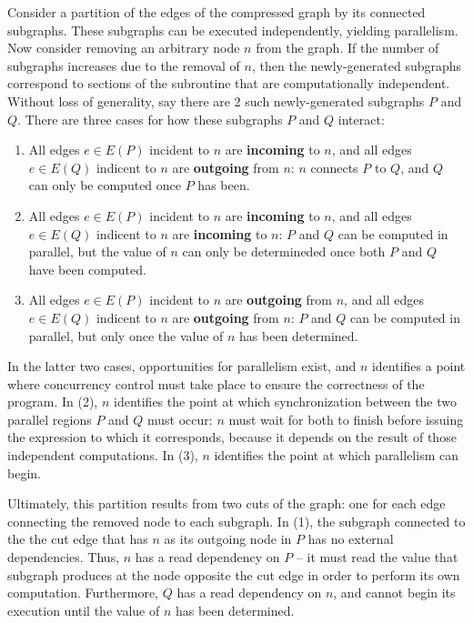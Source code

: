 \documentclass[pageno]{jpaper}
\begin{document}
Consider a partition of the edges of the compressed graph by its connected
subgraphs. These subgraphs can be executed independently, yielding parallelism.
Now consider removing an arbitrary node $n$ from the graph. If the number of
subgraphs increases due to the removal of $n$, then the newly-generated
subgraphs correspond to sections of the subroutine that are computationally
independent. Without loss of generality, say there are 2 such newly-generated
subgraphs $P$ and $Q$. There are three cases for how these subgraphs $P$ and $Q$
interact:
\begin{enumerate}
    \item All edges $e \in E(P)$ incident to $n$ are \textbf{incoming} to $n$,
        and all edges $e \in E(Q)$ indicent to $n$ are \textbf{outgoing} from
        $n$: $n$ connects $P$ to $Q$, and $Q$ can only be computed once $P$ has
        been.
    \item All edges $e \in E(P)$ incident to $n$ are \textbf{incoming} to $n$,
        and all edges $e \in E(Q)$ indicent to $n$ are \textbf{incoming} to $n$:
        $P$ and $Q$ can be computed in parallel, but the value of $n$ can only
        be determineded once both $P$ and $Q$ have been computed.
    \item All edges $e \in E(P)$ incident to $n$ are \textbf{outgoing} from $n$,
        and all edges $e \in E(Q)$ indicent to $n$ are \textbf{outgoing} from
        $n$: $P$ and $Q$ can be computed in parallel, but only once the value of
        $n$ has been determined.
\end{enumerate}

In the latter two cases, opportunities for parallelism exist, and $n$ identifies
a point where concurrency control must take place to ensure the correctness of
the program. In (2), $n$ identifies the point at which synchronization between
the two parallel regions $P$ and $Q$ must occur: $n$ must wait for both to
finish before issuing the expression to which it corresponds, because it depends
on the result of those independent computations. In (3), $n$ identifies the
point at which parallelism can begin.

Ultimately, this partition results from two cuts of the graph: one for each edge
connecting the removed node to each subgraph. In (1), the subgraph connected to
the the cut edge that has $n$ as its outgoing node in $P$ has no external
dependencies. Thus, $n$ has a read dependency on $P$ -- it must read the value
that subgraph produces at the node opposite the cut edge in order to perform its
own computation. Furthermore, $Q$ has a read dependency on $n$, and cannot begin
its execution until the value of $n$ has been determined.
\end{document}
